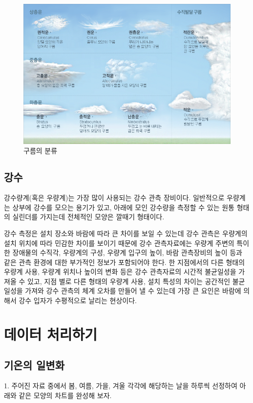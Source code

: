 \begin{itemize}
{\begin{figure}[]
	\centering
	\includegraphics[width=0.95\linewidth]{21observing/images/20}
	\caption{구름의 분류}
	\label{fig:20}
\end{figure}

\subsection{강수}

강수량계(혹은 우량계)는 가장 많이 사용되는 강수 관측 장비이다. 일반적으로 우량계는 상부에 강수를 모으는 용기가 있고, 아래에 모인 강수량을 측정할 수 있는 원통 형태의 실린더를 가지는데 전체적인 모양은 깔때기 형태이다.

강수 측정은 설치 장소와 바람에 따라 큰 차이를 보일 수 있는데 강수 관측은 우량계의 설치 위치에 따라 민감한 차이를 보이기 때문에 강수 관측자료에는 우량계 주변의 특이한 장애물의 수직각, 우량계의 구성, 우량계 입구의 높이, 바람 관측장비의 높이 등과 같은 관측 환경에 대한 부가적인 정보가 포함되어야 한다. 한 지점에서의 다른 형태의 우량계 사용, 우량계 위치나 높이의 변화 등은 강수 관측자료의 시간적 불균일성을 가져올 수 있고, 지점 별로 다른 형태의 우량계 사용, 설치 특성의 차이는 공간적인 불균일성을 가져와 강수 관측의 체계 오차를 만들어 낼 수 있는데 가장 큰 요인은 바람에 의해서 강수 입자가 수평적으로 날리는 현상이다.

\newpage

\section{데이터 처리하기}

\subsection{기온의 일변화}
1. 주어진 자료 중에서 봄, 여름, 가을, 겨울 각각에 해당하는 날을 하루씩 선정하여 아래와 같은 모양의 차트를 완성해 보자.

}
\end{itemize}
